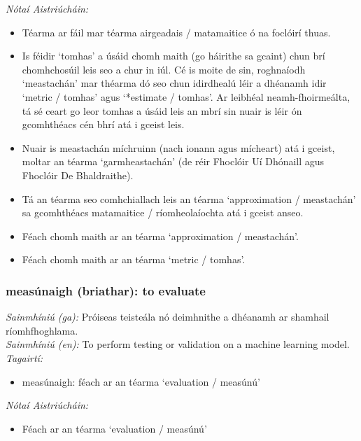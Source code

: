  \noindent \textit{Nótaí Aistriúcháin:}
\begin{itemize}
	\item Téarma ar fáil mar téarma airgeadais / matamaitice ó na foclóirí thuas.
	\item Is féidir `tomhas' a úsáid chomh maith (go háirithe sa gcaint) chun brí chomhchosúil leis seo a chur in iúl. Cé is moite de sin, roghnaíodh `meastachán' mar théarma dó seo chun idirdhealú léir a dhéanamh idir `metric / tomhas' agus `*estimate / tomhas'. Ar leibhéal neamh-fhoirmeálta, tá sé ceart go leor tomhas a úsáid leis an mbrí sin nuair is léir ón gcomhthéacs cén bhrí atá i gceist leis.
	\item Nuair is meastachán míchruinn (nach ionann agus mícheart) atá i gceist, moltar an téarma `garmheastachán' (de réir Fhoclóir Uí Dhónaill agus Fhoclóir De  Bhaldraithe).
	\item Tá an téarma seo comhchiallach leis an téarma `approximation / meastachán' sa gcomhthéacs matamaitice / ríomheolaíochta atá i gceist anseo.
	\item Féach chomh maith ar an téarma `approximation / meastachán'.
	\item Féach chomh maith ar an téarma `metric / tomhas'.
\end{itemize}


\subsubsection*{measúnaigh (briathar): to evaluate}
 \noindent \textit{Sainmhíniú (ga):} Próiseas teisteála nó deimhnithe a dhéanamh ar shamhail ríomhfhoghlama.
\\
 \noindent \textit{Sainmhíniú (en):} To perform testing or validation on a machine learning model.
\\
 \noindent \textit{Tagairtí:}
\begin{itemize}
	\item measúnaigh: féach ar an téarma `evaluation / measúnú'
\end{itemize}

 \noindent \textit{Nótaí Aistriúcháin:}
\begin{itemize}
	\item Féach ar an téarma `evaluation / measúnú'
\end{itemize}


